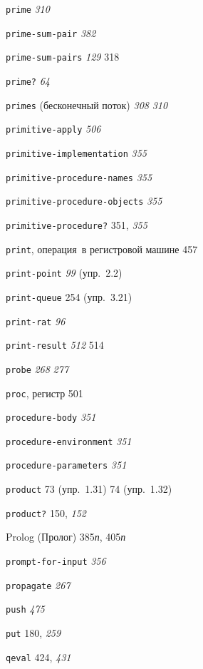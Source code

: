 \begin{theindex}
\item {\texttt{prime}} {\it 310}
\item {\texttt{prime-sum-pair}} {\it 382}
\item {\texttt{prime-sum-pairs}} {\it 129}
   318
\item {\texttt{prime?}} {\it 64}
\item {\texttt{primes} (бесконечный поток)} {\it 308}
   {\it 310}
\item {\texttt{primitive-apply}} {\it 506}
\item {\texttt{primitive-implementation}} {\it 355}
\item {\texttt{primitive-procedure-names}} {\it 355}
\item {\texttt{primitive-procedure-objects}} {\it 355}
\item {\texttt{primitive-procedure?}} 351, {\it 355}
\item {\texttt{print}, операция~в регистровой машине} 457
\item {\texttt{print-point}} {\it 99} (упр.~2.2)
\item {\texttt{print-queue}} 254 (упр.~3.21)
\item {\texttt{print-rat}} {\it 96}
\item {\texttt{print-result}} {\it 512}
   514
\item {\texttt{probe}}
   {\it 268}
   {\it 277}
\item {\texttt{proc}, регистр} 501
\item {\texttt{procedure-body}} {\it 351}
\item {\texttt{procedure-environment}} {\it 351}
\item {\texttt{procedure-parameters}} {\it 351}
\item {\texttt{product}} 73 (упр.~1.31)
   74 (упр.~1.32)
\item {\texttt{product?}} 150, {\it 152}
\item {Prolog (Пролог)} 385{\it п}, 405{\it п}
\item {\texttt{prompt-for-input}} {\it 356}
\item {\texttt{propagate}} {\it 267}
\item {\texttt{push}} {\it 475}
\item {\texttt{put}} 180, {\it 259}
\bigskip
\item {\texttt{qeval}} 424, {\it 431}

\end{theindex}
